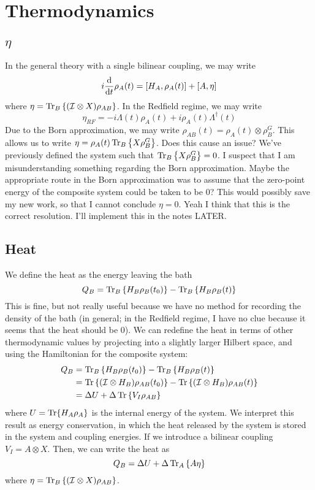 \documentclass{article}
\newcommand{\ten}{\otimes}
\newcommand{\Tra}[1]{\Tr\left\{#1\right\}}
\newcommand{\Ptra}[2]{\Tr_{#1}\left\{#2\right\}}
\newcommand{\I}{\mathcal{I}}
\begin{document}
\section{Thermodynamics}

\subsection{$\eta$}

In the general theory with a single bilinear coupling, we may write
\begin{equation}
i\dv{t}\rho_A(t) = \comm{H_A}{\rho_A(t)} + \comm{A}{\eta}
\end{equation}
where $\eta = \Ptra{B}{(\I\ten X)\rho_{AB}}$. In the Redfield regime, we may write
\begin{equation}
\eta_{RF} = -i\Lambda(t)\rho_A(t) + i\rho_A(t)\Lambda^{\dag}(t)
\end{equation}
Due to the Born approximation, we may write $\rho_{AB}(t) = \rho_A(t)\ten\rho_B^G$. This allows us to write $\eta = \rho_A(t)\Ptra{B}{X\rho_B^G}$. Does this cause an issue? We've previously defined the system such that $\Ptra{B}{X\rho_B^G}=0$. I suspect that I am misunderstanding something regarding the Born approximation. Maybe the appropriate route in the Born approximation was to assume that the zero-point energy of the composite system could be taken to be $0$? This would possibly save my new work, so that I cannot conclude $\eta=0$. Yeah I think that this is the correct resolution. I'll implement this in the notes LATER.

\subsection{Heat}

We define the heat as the energy leaving the bath
\begin{equation}
    Q_B = \Ptra{B}{H_B\rho_B(t_0)} - \Ptra{B}{H_B\rho_B(t)}
\end{equation}
This is fine, but not really useful because we have no method for recording the density of the bath (in general; in the Redfield regime, I have no clue because it seems that the heat should be $0$). We can redefine the heat in terms of other thermodynamic values by projecting into a slightly larger Hilbert space, and using the Hamiltonian for the composite system:
\begin{align}
    Q_B &= \Ptra{B}{H_B\rho_B(t_0)} - \Ptra{B}{H_B\rho_B(t)}\\
    &= \Tra{(\I\ten H_B)\rho_{AB}(t_0)} - \Tra{(\I\ten H_B)\rho_{AB}(t)}\\
    &= \Delta U + \Delta\Tra{V_I\rho_{AB}}
\end{align}
where $U = \Tr{H_A\rho_A}$ is the internal energy of the system. We interpret this result as energy conservation, in which the heat released by the system is stored in the system and coupling energies. If we introduce a bilinear coupling $V_I = A\ten X$. Then, we can write the heat as
\begin{equation}
    Q_B = \Delta U + \Delta\Ptra{A}{A\eta}
\end{equation}
where $\eta = \Ptra{B}{(\I\ten X)\rho_{AB}}$.
\end{document}
